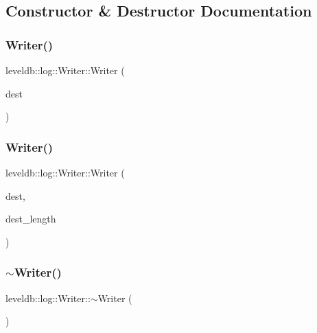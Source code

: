 \subsection{Constructor \& Destructor Documentation}
\mbox{\label{classleveldb_1_1log_1_1_writer_a424f67be4485fdf3ef8ba55c9c559c90}} 
\subsubsection{\texorpdfstring{Writer()}{Writer()}\hspace{0.1cm}{\footnotesize\ttfamily [1/2]}}
{\footnotesize\ttfamily leveldb\+::log\+::\+Writer\+::\+Writer (\begin{DoxyParamCaption}\item[{\mbox{\hyperlink{classleveldb_1_1_writable_file}{Writable\+File}} $\ast$}]{dest }\end{DoxyParamCaption})\hspace{0.3cm}{\ttfamily [explicit]}}

\mbox{\label{classleveldb_1_1log_1_1_writer_ad0460b6358412b6609899a821065c628}} 
\subsubsection{\texorpdfstring{Writer()}{Writer()}\hspace{0.1cm}{\footnotesize\ttfamily [2/2]}}
{\footnotesize\ttfamily leveldb\+::log\+::\+Writer\+::\+Writer (\begin{DoxyParamCaption}\item[{\mbox{\hyperlink{classleveldb_1_1_writable_file}{Writable\+File}} $\ast$}]{dest,  }\item[{uint64\+\_\+t}]{dest\+\_\+length }\end{DoxyParamCaption})}

\mbox{\label{classleveldb_1_1log_1_1_writer_a71bcdee2a87eb535fd60a3fe047e66be}} 
\subsubsection{\texorpdfstring{$\sim$Writer()}{~Writer()}}
{\footnotesize\ttfamily leveldb\+::log\+::\+Writer\+::$\sim$\+Writer (\begin{DoxyParamCaption}{ }\end{DoxyParamCaption})}



